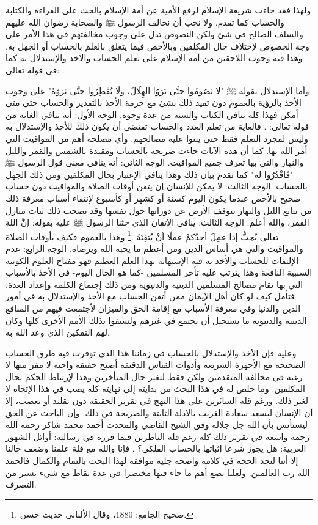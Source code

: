 ولهذا فقد جاءت شريعة الإسلام لرفع الأمية عن أمة الإسلام بالحث على القراءة والكتابة والحساب كما تقدم. ولا نحب أن نخالف الرسول ﷺ والصحابة رضوان الله عليهم والسلف الصالح في شئ ولكن النصوص تدل على وجوب مخالفتهم في هذا الأمر على وجه الخصوص لإختلاف حال المكلفين وبالأخص فيما يتعلق بالعلم بالحساب أو الجهل به. وهذا فيه وجوب اللاحقين من أمة الإسلام على تعلم الحساب والأخذ والإستدلال به كما في قوله تعالى: \quranayah*[10][5] {\footnotesize (\surahname*[10])}.

وأما الإستدلال بقوله ﷺ "لا تَصُومُوا حتَّى تَرَوُا الهِلَالَ، ولَا تُفْطِرُوا حتَّى تَرَوْهُ" على وجوب الأخذ بالرؤية بالعموم دون تقيد ذلك بشئ مع حرمة الأخذ بالتقدير والحساب حتى متى أمكن فهذا كله ينافي الكتاب والسنة من عدة وجوه. الوجه الأول: أنه ينافي الغاية من قوله تعالى: \quranayah*[10][5] {\footnotesize (\surahname*[10])}. فالغاية من تعلم العدد والحساب تقتضى أن يكون ذلك للأخذ والإستدلال به وليس لمجرد التعلم فقط حتى يبنوا عليه مصالحهم. وأي مصلحة أهم من المواقيت التي أمر الله بها. كما أن هذه الآيات جاءت صريحة بالحساب ومقيدة بالشمس والقمر والليل والنهار والتي بها تعرف جميع المواقيت. الوجه الثاني: أنه ينافي معنى قول الرسول ﷺ
"فَاقْدُرُوا له" كما تقدم بيان ذلك وهذا ينافي الإعتبار بحال المكلفين ومن ذلك الجهل بالحساب. الوجه الثالث: لا يمكن للإنسان إن يتقن أوقات الصلاة والمواقيت دون حساب صحيح بالأخص عندما يكون اليوم كسنة أو كشهر أو كأسبوع لإنتفاء أسباب معرفة ذلك من تتابع الليل والنهار بتوقف الأرض عن دورانها حول نفسها وقد يصحب ذلك ثبات منازل القمر، والله أعلم. الوجه الثالث: ينافي الإتقان الذي حثنا الرسول ﷺ عليه بقوله: إنَّ اللهَ تعالى يُحِبُّ إذا عمِلَ أحدُكمْ عملًا أنْ يُتقِنَهُ \href{https://shamela.ws/book/21659/2761#p1}{\faExternalLink} \cite{jamaaSagheer}.\footnote{صحيح الجامع: 1880، وقال الألباني حديث حسن.} وهذا بالعموم فكيف بأوقات الصلاة والمواقيت والتي هي أساس الدين ومن أعظم ما يحبه الله ويرضاه. الوجه الرابع: عدم الإلتفات للحساب والأخذ به فيه الإستهانة بهذا العلم العظيم فهو مفتاح العلوم الكونية السببية النافعة وهذا يترتب عليه تأخر المسلمين -كما هو الحال اليوم- في الأخذ بالأسباب التي بها تقام مصالح المسلمين الدينية والدنيوية ومن ذلك إجتماع الكلمة وإعداد العدة. فتأمل كيف لو كان أهل الإيمان ممن أتقن الحساب مع الأخذ والإستدلال به في أمور الدين والدنيا وفي معرفة الأسباب مع إقامة الحق والميزان لأجتمعت فيهم من المنافع الدينية والدنيوية ما يستحيل أن يجتمع في غيرهم ولسبقوا بذلك الأمم الأخرى كلها وكان لهم التمكين الذي وعد الله به.

وعليه فإن الأخذ والإستدلال بالحساب في زماننا هذا الذي توفرت فيه طرق الحساب الصحيحة مع الأجهزة السريعة وأدوات القياس الدقيقة أصبح حقيقة واجبة لا مفر منها لا رغبة في مخالفة المتقدمين ولكن فقط لتغير حال المتأخرين وهذا لإرتباط الحكم بحال المكلفين. وما خلص له في هذا البحث من بدايته إلى نهايته كله يصب في هذا الإتجاه لا لغير ذلك. ورغم قلة السائرين على هذا النهج في تقرير الحقيقة دون تقليد أو تعصب، إلا أن الإنسان ليسعد سعادة الغريب بالأدلة الثابتة والصريحة في ذلك. وإن الباحث عن الحق ليستأنس بأن الله جل جلاله وفق الشيخ القاضي والمحدث أحمد محمد شاكر رحمه الله رحمة واسعة في تقرير ذلك كله رغم قلة الناظرين فيما قرره في رسالته: أوائل الشهور العربية: هل يجوز شرعا إثباتها بالحساب الفلكي؟ \cite{shuhur_ahmidShakir}. فإنا والله مع قلة علمنا وضعف حالنا إلا أننا  لنجد الحجة في كلامه واضحة جلية موافقة لهذا البحث بالتمام والكمال فالحمد الله رب العالمين. ولعلنا نضع أهم ما جاء فيها مختصرا في عدة نقاط مع شيء يسير من التصرف.


